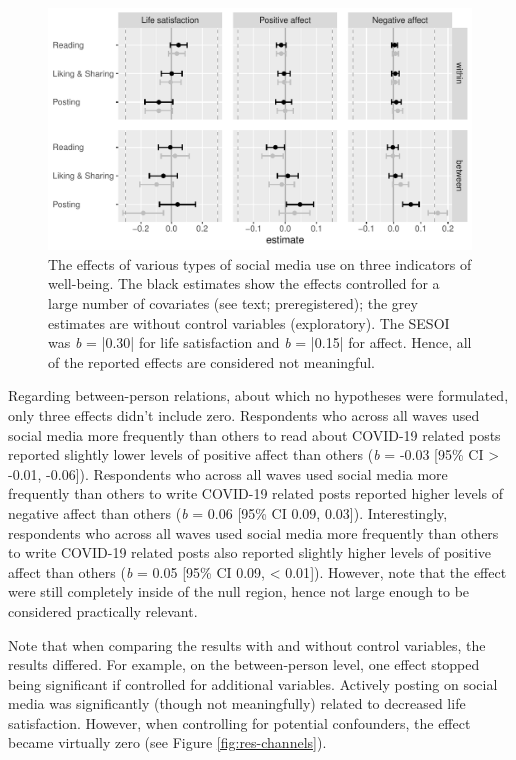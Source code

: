 \documentclass[
  english,
  man,mask,floatsintext]{apa6}
\begin{document}
\begin{figure}
\includegraphics[width=\textwidth]{figures/fig_results_activity} \caption{The effects of various types of social media use on three indicators of well-being. The black estimates show the effects controlled for a large number of covariates (see text; preregistered); the grey estimates are without control variables (exploratory). The SESOI was \textit{b} = |0.30| for life satisfaction and \textit{b} = |0.15| for affect. Hence, all of the reported effects are considered not meaningful.}\label{fig:res-activity}
\end{figure}

Regarding between-person relations, about which no hypotheses were formulated, only three effects didn't include zero.
Respondents who across all waves used social media more frequently than others to read about COVID-19 related posts reported slightly lower levels of positive affect than others (\emph{b} = -0.03 {[}95\% CI \textgreater{} -0.01, -0.06{]}).
Respondents who across all waves used social media more frequently than others to write COVID-19 related posts reported higher levels of negative affect than others (\emph{b} = 0.06 {[}95\% CI 0.09, 0.03{]}).
Interestingly, respondents who across all waves used social media more frequently than others to write COVID-19 related posts also reported slightly higher levels of positive affect than others (\emph{b} = 0.05 {[}95\% CI 0.09, \textless{} 0.01{]}).
However, note that the effect were still completely inside of the null region, hence not large enough to be considered practically relevant.

Note that when comparing the results with and without control variables, the results differed.
For example, on the between-person level, one effect stopped being significant if controlled for additional variables.
Actively posting on social media was significantly (though not meaningfully) related to decreased life satisfaction.
However, when controlling for potential confounders, the effect became virtually zero (see Figure \ref{fig:res-channels}).
\end{document}
